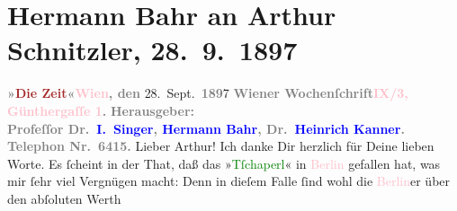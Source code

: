 

               \section[Hermann Bahr an Arthur Schnitzler, 28. 9. 1897]{ Hermann Bahr an Arthur Schnitzler, 28. 9. 1897}\nopagebreak{}\rehead{ }\normalsize\beginnumbering{} \toendnotes[C]{\smallbreak\pagebreak[2]} 
\toendnotes[C]{\smallbreak}\pstart
           \noindent{}{\pb}\textcolor{gray}{\textbf{»\textcolor{brown}{Die
                        Zeit}{}\ledrightnote{\textcolor{brown}{Die Zeit. Wiener Wochenschrift}}«}}\hfill \textcolor{gray}{\textbf{\textbf{\textcolor{pink}{Wien}{}\ledrightnote{\textcolor{pink}{Wien}}}, den }}28. Sept. \textcolor{gray}{\textbf{189}}7\pend
           \pstart
           \textcolor{gray}{\textbf{Wiener Wochenſchrift}}\hfill \textcolor{gray}{\textbf{\textcolor{pink}{IX/3, Günthergaſſe 1}{}\ledrightnote{\textcolor{pink}{Günthergasse}}.}}\pend
           \pstart
           \textcolor{gray}{\textbf{\textbf{Herausgeber}:}}{\\}\textcolor{gray}{\textbf{Profeſſor Dr. \textcolor{blue}{I. Singer}{}\ledrightnote{\textcolor{blue}{Isidor Singer}}, \textcolor{blue}{Hermann Bahr}{}\ledrightnote{\textcolor{blue}{Hermann Bahr}},
                        Dr. \textcolor{blue}{Heinrich Kanner}{}\ledrightnote{\textcolor{blue}{Heinrich Kanner}}.}}\pend
           \pstart
           \textcolor{gray}{\textbf{Telephon Nr. 6415.}}\pend
           \pstart\center{}Lieber Arthur!\pend\pstart
           Ich danke Dir herzlich für Deine lieben Worte. Es ſcheint in der That, daß das »\textcolor{green}{Tſchaperl}{}\ledrightnote{\textcolor{green}{Das Tschaperl}}« in \textcolor{pink}{Berlin}{}\ledrightnote{\textcolor{pink}{Berlin}} gefallen hat, was mir ſehr viel Vergnügen macht: Denn in dieſem Falle
               ſind wohl die \textcolor{pink}{Berlin}{}\ledrightnote{\textcolor{pink}{Berlin}}er über den abſoluten Werth
